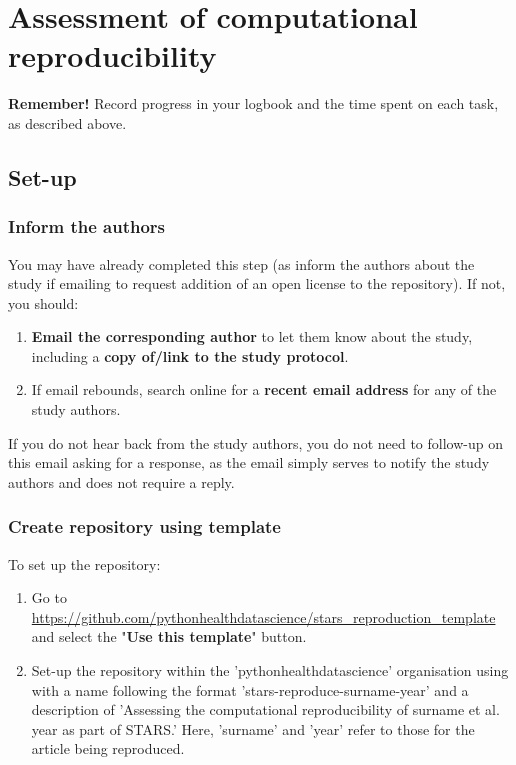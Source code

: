 \section{Assessment of computational reproducibility} \label{sec:reproduce}

\textbf{Remember!} Record progress in your logbook and the time spent on each task, as described above.

\vspace{0.5cm}
\subsection{Set-up}

\subsubsection{Inform the authors}

You may have already completed this step (as inform the authors about the study if emailing to request addition of an open license to the repository). If not, you should:
\begin{enumerate}
    \item \textbf{Email the corresponding author} to let them know about the study, including a \textbf{copy of/link to the study protocol}.
    \item If email rebounds, search online for a \textbf{recent email address} for any of the study authors.
\end{enumerate}

If you do not hear back from the study authors, you do not need to follow-up on this email asking for a response, as the email simply serves to notify the study authors and does not require a reply.

\vspace{0.5cm}
\subsubsection{Create repository using template}

To set up the repository:

\begin{enumerate}
    \item Go to \url{https://github.com/pythonhealthdatascience/stars_reproduction_template} and select the "\textbf{Use this template}" button.
    \item Set-up the repository within the 'pythonhealthdatascience' organisation using with a name following the format 'stars-reproduce-surname-year' and a description of 'Assessing the computational reproducibility of surname et al. year as part of STARS.' Here, 'surname' and 'year' refer to those for the article being reproduced.
\end{enumerate}

